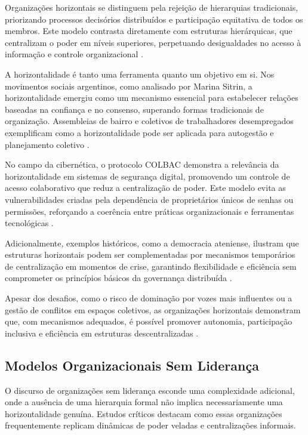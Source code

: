 Organizações horizontais se distinguem pela rejeição de hierarquias
tradicionais, priorizando processos decisórios distribuídos e participação
equitativa de todos os membros. Este modelo contrasta diretamente com
estruturas hierárquicas, que centralizam o poder em níveis superiores,
perpetuando desigualdades no acesso à informação e controle organizacional
\cite{Non-HierarchicalForms, EstatutosDoPCP}.

A horizontalidade é tanto uma ferramenta quanto um objetivo em si. Nos
movimentos sociais argentinos, como analisado por Marina Sitrin, a
horizontalidade emergiu como um mecanismo essencial para estabelecer
relações baseadas na confiança e no consenso, superando formas tradicionais
de organização. Assembleias de bairro e coletivos de trabalhadores
desempregados exemplificam como a horizontalidade pode ser aplicada para
autogestão e planejamento coletivo \cite{EverydayRevolutions}.

No campo da cibernética, o protocolo COLBAC demonstra a relevância da
horizontalidade em sistemas de segurança digital, promovendo um controle de
acesso colaborativo que reduz a centralização de poder. Este modelo evita
as vulnerabilidades criadas pela dependência de proprietários únicos de
senhas ou permissões, reforçando a coerência entre práticas organizacionais
e ferramentas tecnológicas \cite{Colbac}.

Adicionalmente, exemplos históricos, como a democracia ateniense, ilustram
que estruturas horizontais podem ser complementadas por mecanismos
temporários de centralização em momentos de crise, garantindo flexibilidade
e eficiência sem comprometer os princípios básicos da governança
distribuída \cite{AthenianDemocracyABrief}.

Apesar dos desafios, como o risco de dominação por vozes mais influentes ou
a gestão de conflitos em espaços coletivos, as organizações horizontais
demonstram que, com mecanismos adequados, é possível promover autonomia,
participação inclusiva e eficiência em estruturas descentralizadas
\cite{SocialMediaTeamsAsDigitalVanguards}.

\subsection{Modelos Organizacionais Sem Liderança}
\label{sec:modelos_sem_lideranca}

O discurso de organizações sem liderança esconde uma complexidade
adicional, onde a ausência de uma hierarquia formal não implica
necessariamente uma horizontalidade genuína. Estudos críticos destacam como
essas organizações frequentemente replicam dinâmicas de poder veladas e
centralizações informais.


